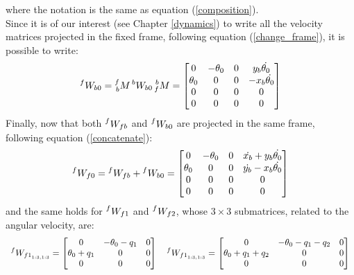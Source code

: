 \documentclass[a4paper,12pt,oneside]{report}
\begin{document}
where the notation is the same as equation (\ref{composition}).\\
Since it is of our interest (see Chapter \ref{dynamics}) to write all the velocity matrices projected in the fixed frame, following equation (\ref{change_frame}), it is possible to write:
\begin{equation}
    \prescript{f}{}{W_{b0}}=\prescript{f}{b}{M}\prescript{b}{}{W_{b0}}\prescript{b}{f}{M}=\begin{bmatrix}
      0&-\theta_0&0&y_b \dot{\theta_0}\\
      \theta_0&0&0&-x_b \dot{\theta_0}\\
      0&0&0&0\\
      0&0&0&0
    \end{bmatrix}
  \label{W_bo}
\end{equation}
Finally, now that both $\prescript{f}{}{W_{fb}}$ and $\prescript{f}{}{W_{b0}}$ are projected in the same frame, following equation (\ref{concatenate}):
\begin{equation}
    \prescript{f}{}{W_{f0}}=\prescript{f}{}{W_{fb}}+\prescript{f}{}{W_{b0}}=\begin{bmatrix}
      0&-\theta_0&0&\dot{x_b}+y_b \dot{\theta_0}\\
      \theta_0&0&0&\dot{y_b}-x_b \dot{\theta_0}\\
      0&0&0&0\\
      0&0&0&0
    \end{bmatrix}
    \label{arm_1_vel}
\end{equation}
and the same holds for $\prescript{f}{}{W_{f1}}$ and $\prescript{f}{}{W_{f2}}$, whose $3\times 3$ submatrices, related to the angular velocity, are:
  \begin{equation}
    \begin{array}{c}
      \prescript{f}{}{W_{{f1}_{1:3,1:3}}}=\begin{bmatrix}
        0&-\theta_0-q_1&0\\
        \theta_0+q_1&0&0\\
        0&0&0
      \end{bmatrix} \quad
      \prescript{f}{}{W_{{f1}_{1:3,1:3}}}=\begin{bmatrix}
        0&-\theta_0-q_1-q_2&0\\
        \theta_0+q_1+q_2&0&0\\
        0&0&0
      \end{bmatrix}
    \end{array}
    \label{arms_velocity}
  \end{equation}
\end{document}
